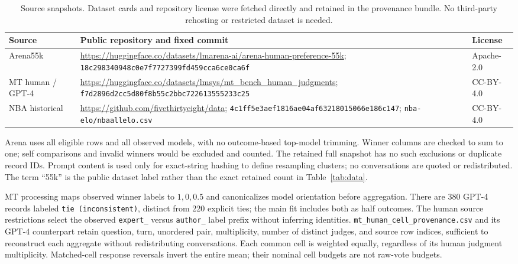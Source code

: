 \begin{table}[h]
\centering\small
\caption{Source snapshots. Dataset cards and repository license were fetched directly and retained in the provenance bundle. No third-party rehosting or restricted dataset is needed.}\label{tab:sources}
\begin{tabular}{p{.17\linewidth}p{.57\linewidth}p{.17\linewidth}}
\toprule
Source & Public repository and fixed commit & License\\
\midrule
Arena55k & \url{https://huggingface.co/datasets/lmarena-ai/arena-human-preference-55k}; \texttt{18c298340948c0e7f7727399fd459cca6ce0ca6f} & Apache-2.0\\
MT human / GPT-4 & \url{https://huggingface.co/datasets/lmsys/mt_bench_human_judgments}; \texttt{f7d2896d2cc5d80f8b55c2bbc722613555233c25} & CC-BY-4.0\\
NBA historical & \url{https://github.com/fivethirtyeight/data}; \texttt{4c1ff5e3aef1816ae04af63218015066e186c147}; \texttt{nba-elo/nbaallelo.csv} & CC-BY-4.0\\
\bottomrule
\end{tabular}

\end{table}

Arena uses all eligible rows and all observed models, with no outcome-based top-model trimming. Winner columns are checked to sum to one; self comparisons and invalid winners would be excluded and counted. The retained full snapshot has no such exclusions or duplicate record IDs. Prompt content is used only for exact-string hashing to define resampling clusters; no conversations are quoted or redistributed. The term ``55k'' is the public dataset label rather than the exact retained count in Table~\ref{tab:data}.

MT processing maps observed winner labels to $1,0,0.5$ and canonicalizes model orientation before aggregation. There are 380 GPT-4 records labeled \texttt{tie (inconsistent)}, distinct from 220 explicit ties; the main fit includes both as half outcomes. The human source restrictions select the observed \texttt{expert\_} versus \texttt{author\_} label prefix without inferring identities. \texttt{mt\_human\_cell\_provenance.csv} and its GPT-4 counterpart retain question, turn, unordered pair, multiplicity, number of distinct judges, and source row indices, sufficient to reconstruct each aggregate without redistributing conversations. Each common cell is weighted equally, regardless of its human judgment multiplicity. Matched-cell response reversals invert the entire mean; their nominal cell budgets are not raw-vote budgets.

